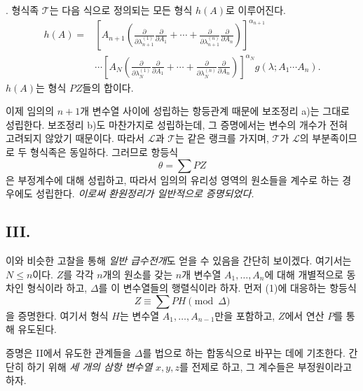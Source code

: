. 형식족 $\mathcal T$는 다음 식으로 정의되는 모든 형식 $h(A)$로 이루어진다.
\[
\begin{aligned}
 h(A)=&\left[A_{n+1}\left(
 \frac{\partial}{\partial\lambda_{n+1}^{(1)}}\frac{\partial}{\partial A_1}
 +\cdots+
 \frac{\partial}{\partial\lambda_{n+1}^{(n)}}\frac{\partial}{\partial A_n}\right)\right]^{\alpha_{n+1}} \\
&\cdots
\left[A_N\left(
 \frac{\partial}{\partial\lambda_N^{(1)}}\frac{\partial}{\partial A_1}
 +\cdots+
 \frac{\partial}{\partial\lambda_N^{(n)}}\frac{\partial}{\partial A_n}\right)\right]^{\alpha_N}
 g(\lambda;A_1\cdots A_n).
\end{aligned}
\]
$h(A)$는 형식 $PZ$들의 합이다.

이제 임의의 $n+1$개 변수열 사이에 성립하는 항등관계 때문에 보조정리 a)는 그대로 성립한다. 보조정리 b)도 마찬가지로 성립하는데, 그 증명에서는 변수의 개수가 전혀 고려되지 않았기 때문이다. 따라서 $\mathcal L$과 $\mathcal T$는 같은 랭크를 가지며, $\mathcal T$가 $\mathcal L$의 부분족이므로 두 형식족은 동일하다. 그러므로 항등식
\[
  \theta=\sum PZ
\]
은 부정계수에 대해 성립하고, 따라서 임의의 유리성 영역의 원소들을 계수로 하는 경우에도 성립한다. \emph{이로써 환원정리가 일반적으로 증명되었다.}

\subsection*{III.}
이와 비슷한 고찰을 통해 \emph{일반 급수전개}도 얻을 수 있음을 간단히 보이겠다. 여기서는 $N\le n$이다. $Z$를 각각 $n$개의 원소를 갖는 $n$개 변수열 $A_1,\ldots,A_n$에 대해 개별적으로 동차인 형식이라 하고, $\Delta$를 이 변수열들의 행렬식이라 하자. 먼저 (1)에 대응하는 항등식
\begin{equation}
  Z\equiv\sum PH \pmod{\Delta}
\tag{2}
\end{equation}
을 증명한다. 여기서 형식 $H$는 변수열 $A_1,\ldots,A_{n-1}$만을 포함하고, $Z$에서 연산 $P$를 통해 유도된다.

증명은 II에서 유도한 관계들을 $\Delta$를 법으로 하는 합동식으로 바꾸는 데에 기초한다. 간단히 하기 위해 \emph{세 개의 삼항 변수열} $x,y,z$를 전제로 하고, 그 계수들은 부정원이라고 하자.

